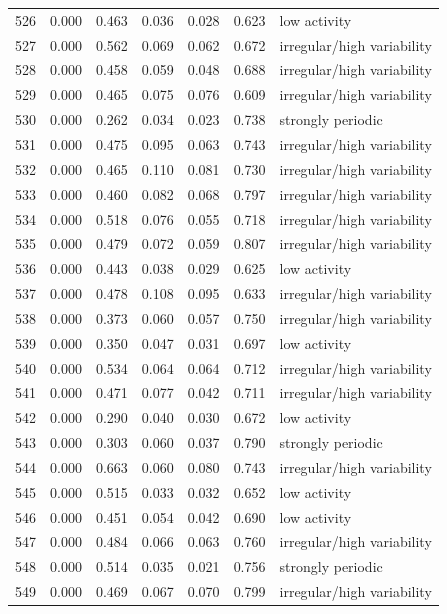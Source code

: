 \begin{longtable}{lrrrrrl}
526 & 0.000 & 0.463 & 0.036 & 0.028 & 0.623 & low activity \\
527 & 0.000 & 0.562 & 0.069 & 0.062 & 0.672 & irregular/high variability \\
528 & 0.000 & 0.458 & 0.059 & 0.048 & 0.688 & irregular/high variability \\
529 & 0.000 & 0.465 & 0.075 & 0.076 & 0.609 & irregular/high variability \\
530 & 0.000 & 0.262 & 0.034 & 0.023 & 0.738 & strongly periodic \\
531 & 0.000 & 0.475 & 0.095 & 0.063 & 0.743 & irregular/high variability \\
532 & 0.000 & 0.465 & 0.110 & 0.081 & 0.730 & irregular/high variability \\
533 & 0.000 & 0.460 & 0.082 & 0.068 & 0.797 & irregular/high variability \\
534 & 0.000 & 0.518 & 0.076 & 0.055 & 0.718 & irregular/high variability \\
535 & 0.000 & 0.479 & 0.072 & 0.059 & 0.807 & irregular/high variability \\
536 & 0.000 & 0.443 & 0.038 & 0.029 & 0.625 & low activity \\
537 & 0.000 & 0.478 & 0.108 & 0.095 & 0.633 & irregular/high variability \\
538 & 0.000 & 0.373 & 0.060 & 0.057 & 0.750 & irregular/high variability \\
539 & 0.000 & 0.350 & 0.047 & 0.031 & 0.697 & low activity \\
540 & 0.000 & 0.534 & 0.064 & 0.064 & 0.712 & irregular/high variability \\
541 & 0.000 & 0.471 & 0.077 & 0.042 & 0.711 & irregular/high variability \\
542 & 0.000 & 0.290 & 0.040 & 0.030 & 0.672 & low activity \\
543 & 0.000 & 0.303 & 0.060 & 0.037 & 0.790 & strongly periodic \\
544 & 0.000 & 0.663 & 0.060 & 0.080 & 0.743 & irregular/high variability \\
545 & 0.000 & 0.515 & 0.033 & 0.032 & 0.652 & low activity \\
546 & 0.000 & 0.451 & 0.054 & 0.042 & 0.690 & low activity \\
547 & 0.000 & 0.484 & 0.066 & 0.063 & 0.760 & irregular/high variability \\
548 & 0.000 & 0.514 & 0.035 & 0.021 & 0.756 & strongly periodic \\
549 & 0.000 & 0.469 & 0.067 & 0.070 & 0.799 & irregular/high variability \\

\end{longtable}
